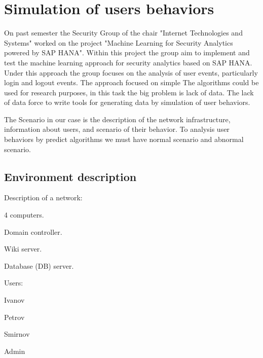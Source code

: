 \section{Simulation of users behaviors}
On past semester the Security Group of the chair "Internet Technologies and Systems" worked on the project "Machine Learning for Security Analytics powered by SAP HANA". Within this project the group aim to implement and test the machine learning approach for security analytics based on SAP HANA. Under this approach the group focuses on the analysis of user events, particularly login and logout events. The approach focused on simple  The algorithms could be used for research purposes, in this task the big problem is lack of data. The lack of data force to write tools for generating data by simulation of user behaviors. 

The Scenario in our case is the description of the network infrastructure, information about users, and scenario of their behavior. To analysis user behaviors by predict algorithms we must have normal scenario and abnormal scenario.  
  
\subsection{Environment description}

Description of a network:
\begin{compactitem}
\item 4 computers.
\item Domain controller. 
\item Wiki server.
\item Database (DB) server.
\end{compactitem}
Users: 
\begin{compactitem}
\item Ivanov
\item Petrov
\item Smirnov
\item Admin
\end{compactitem}
     
